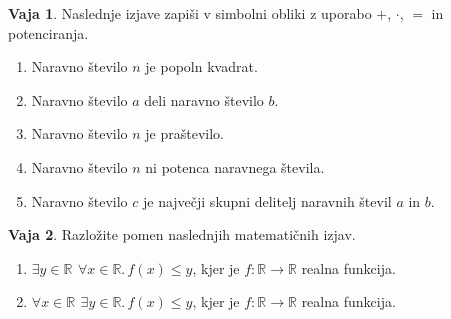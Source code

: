 \documentclass{article}
\theoremstyle{definition}
\newtheorem{vaja}{Vaja}
\begin{document}
\begin{vaja}
Naslednje izjave zapiši v simbolni obliki z uporabo $+$, $\cdot$, $=$ in potenciranja.
 \begin{enumerate}
 \item Naravno število $n$ je popoln kvadrat.  %
 \item Naravno število $a$ deli naravno število $b$. %
 \item Naravno število $n$ je praštevilo.%
  \item Naravno število $n$ ni potenca naravnega števila.%
  \item Naravno število $c$ je največji skupni delitelj naravnih števil $a$ in $b$. %
 
\end{enumerate}
\end{vaja}

\begin{vaja}
Razložite pomen naslednjih matematičnih izjav.
\begin{enumerate}
 \item $\exists y \in \mathbb{R}\,\ \forall x \in \mathbb{R}. \,  f(x) \leq y$, kjer je $f \colon \mathbb{R} \to \mathbb{R}$ realna funkcija.
 \item $\forall x \in \mathbb{R}\,\ \exists y \in \mathbb{R}. \,  f(x) \leq y$, kjer je $f \colon \mathbb{R} \to \mathbb{R}$ realna funkcija.
 \end{enumerate}
\end{vaja}
\end{document}
